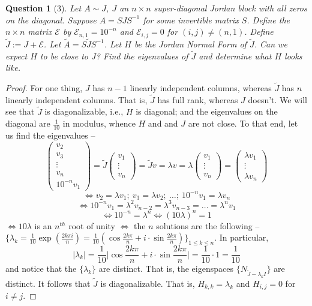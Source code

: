 \documentclass[11pt]{article}
\theoremstyle{quest}
\newtheorem*{question}{Question}
\begin{document}
\begin{question}[3]
Let $A \sim J$, $J$ an $n \times n$ super-diagonal Jordan block with all zeros on the diagonal. Suppose $A = SJS^{-1}$ for some invertible matrix $S$. Define the $n \times n$ matrix $\mathcal{E}$ by $\mathcal{E}_{n, 1} = 10^{-n}$ and $\mathcal{E}_{i, j} = 0$ for $(i, j) \ne (n, 1)$. Define $\tilde{J} := J + \mathcal{E}$. Let $\tilde{A} = S\tilde{J}S^{-1}$. Let $H$ be the Jordan Normal Form of $\tilde{J}$. Can we expect $H$ to be close to $J$? Find the eigenvalues of $\tilde{J}$ and determine what $H$ looks like.
\end{question}
\begin{proof}
For one thing, $J$ has $n-1$ linearly independent columns, whereas $\tilde{J}$ has $n$ linearly independent columns. That is, $\tilde{J}$ has full rank, whereas $J$ doesn't. We will see that $\tilde{J}$ is diagonalizable, i.e., $H$ is diagonal; and the eigenvalues on the diagonal are $\frac{1}{10}$ in modulus, whence $H$ and and $J$ are not close. To that end, let us find the eigenvalues --
$$\begin{pmatrix}
v_2 \\ v_3 \\ \vdots \\ v_n \\ 10^{-n}v_1
\end{pmatrix}= \tilde{J} \begin{pmatrix}
v_1 \\ \vdots \\ v_n
\end{pmatrix} = \tilde{J}v = \lambda v = \lambda \begin{pmatrix}
v_1 \\ \vdots \\ v_n
\end{pmatrix} = \begin{pmatrix}
\lambda v_1 \\ \vdots \\ \lambda v_n
\end{pmatrix}$$
$$\iff v_2 = \lambda v_1;\ v_3 = \lambda v_2;\ \ldots ;\ 10^{-n} v_1 = \lambda v_n$$
$$\iff 10^{-n} v_1 = \lambda^2 v_{n-2} = \lambda^3 v_{n-3} = \ldots = \lambda^n v_1$$
$$\iff 10^{-n} = \lambda^n \iff (10\lambda)^n = 1$$
$\iff 10\lambda$ is an $n^{th}$ root of unity $\iff$ the $n$ solutions are the following -- 
\\$\{\lambda_k = \frac{1}{10}\exp(\frac{2k\pi i}{n}) = \frac{1}{10}(\cos \frac{2k\pi}{n} + i\cdot\sin \frac{2k\pi}{n})\}_{1 \le k \le n}.$ In particular, $$|\lambda_k| = \frac{1}{10} \Big|\cos\frac{2k\pi}{n} + i \cdot \sin \frac{2k\pi}{n} \Big| = \frac{1}{10} \cdot 1 = \frac{1}{10}$$
and notice that the $\{\lambda_k\}$ are distinct. That is, the eigenspaces $\{N_{\tilde{J}-\lambda_k I}\}$ are distinct. It follows that $\tilde{J}$ is diagonalizable. That is, $H_{k,k} = \lambda_k$ and $H_{i, j} = 0$ for $i \ne j$.
\end{proof}
\end{document}
